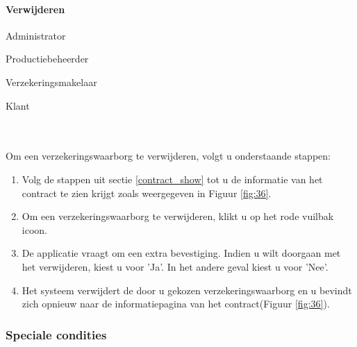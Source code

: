 \documentclass[11pt,openany]{article}
\newcommand{\cmark}{\ding{51}}%
\newcommand{\xmark}{\ding{55}}%
\newcommand{\done}{\rlap{$\square$}{\raisebox{2pt}{\large\hspace{1pt}\cmark}}%
	\hspace{-2.5pt}}
\newcommand{\wontfix}{\rlap{$\square$}{\large\hspace{1pt}\xmark}}
\begin{document}
\paragraph{Verwijderen}
\begin{todolist}
	\item[\done] Administrator
	\item[\done] Productiebeheerder
	\item[\done] Verzekeringsmakelaar
	\item[\wontfix] Klant 
\end{todolist}
\\
\\
Om een verzekeringswaarborg te verwijderen, volgt u onderstaande stappen:
\begin{enumerate}
	\item  Volg de stappen uit sectie \ref{contract_show} tot u de informatie van het contract te zien krijgt zoals weergegeven in Figuur \ref{fig:36}.
	\item Om een verzekeringswaarborg te verwijderen, klikt u op het rode vuilbak icoon.
	\item De applicatie vraagt om een extra bevestiging. Indien u wilt doorgaan met het verwijderen, kiest u voor 'Ja'. In het andere geval kiest u voor 'Nee'.
	\item Het systeem verwijdert de door u gekozen verzekeringswaarborg en u bevindt zich opnieuw naar de informatiepagina van het contract(Figuur \ref{fig:36}).
\end{enumerate}












\subsubsection{Speciale condities}
\label{special_conditions}
\end{document}
